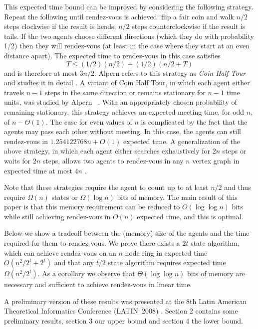 \documentclass[acmtoalg]{acmtrans2m}
\begin{document}
This expected time bound can be improved by considering the following
strategy.  Repeat the following until rendez-vous is achieved: flip a
fair coin and walk $n/2$ steps clockwise if the result is heads, $n/2$
steps counterclockwise if the result is tails.  If the two agents choose
different directions (which they do with probability 1/2) then they will
rendez-vous (at least in the case where they start at an even distance
apart).  The expected time to rendez-vous in this case satisfies 
\[
  T \le (1/2)(n/2) + (1/2)(n/2+T)
\]
and is therefore at most $3n/2$.  Alpern refers to this strategy
as \emph{Coin Half Tour} and studies it in detail \cite{alpern95}.
A variant of Coin Half Tour, in which each agent either travels $n-1$
steps in the same direction or remains stationary for $n-1$ time units,
was studied by Alpern \etal\ \cite{abe99}.  With an appropriately chosen
probability of remaining stationary, this strategy achieves an expected
meeting time, for odd $n$, of $n-\Theta(1)$. The case for even values
of $n$ is complicated by the fact that the agents may pass each other
without meeting. In this case, the agents can still rendez-vous in
$1.254122768n + O(1)$ expected time.  A generalization of the above
strategy, in which each agent either searches exhaustively for $2n$
steps or waits for $2n$ steps, allows two agents to rendez-vous in any
$n$ vertex graph in expected time at most $4n$ \cite[Section~4]{abe99}.

Note that these strategies require the agent to count up to at least $n/2$
and thus require $\Omega(n)$ states or $\Omega(\log n)$ bits of memory.
The main result of this paper is that this memory requirement can be
reduced to $O(\log\log n)$ bits while still achieving rendez-vous in
$O(n)$ expected time, and this is optimal.

Below we show a tradeoff between the (memory) size of the agents and
the time required for them to rendez-vous. We prove there exists a $2t$
state algorithm,   which can achieve rendez-vous on an $n$ node ring in
expected time $O(n^2/2^{t} + 2^{t} )$ and that any $t/2$ state algorithm
requires expected time $\Omega( n^2/2^t )$.  As a corollary we observe
that $\Theta(\log \log n)$ bits of memory are necessary and sufficient
to achieve rendez-vous in linear time.

A preliminary version of these results was presented at the 8th
Latin American Theoretical Informatics Conference (LATIN~2008)
\cite{latin}. Section 2 contains some preliminary results, section 3
our upper bound and section 4 the lower bound.
\end{document}
